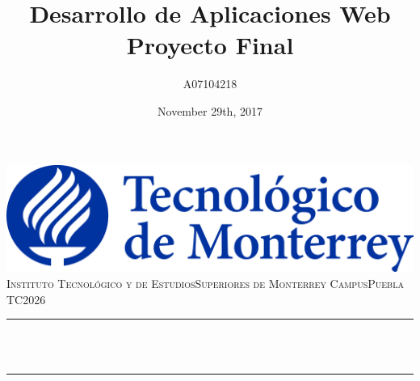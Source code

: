 \documentclass[12pt]{article}
\title{Desarrollo de Aplicaciones Web \newline\newline Proyecto Final}          %
\author{A07104218}                                                              %
\date{November 29th, 2017}                                                      %
\makeatletter
\let\thetitle\@title
\makeatother
\begin{document}

\begin{titlepage}
    \centering
    \vspace*{0.5 cm}
    \includegraphics[scale = 0.25]{logoITESM.png}\\[1.0 cm] %
    \textsc{\LARGE Instituto Tecnológico y de Estudios\newline\newline Superiores de Monterrey Campus\newline\newline Puebla}\\[2.0 cm] %
    \textsc{\Large TC2026}\\[0.5 cm]                %
    \rule{\linewidth}{0.2 mm} \\[0.4 cm]
    { \huge \bfseries \thetitle}\\
    \rule{\linewidth}{0.2 mm} \\[1.5 cm]
    
            
        

\end{titlepage}
\end{document}
